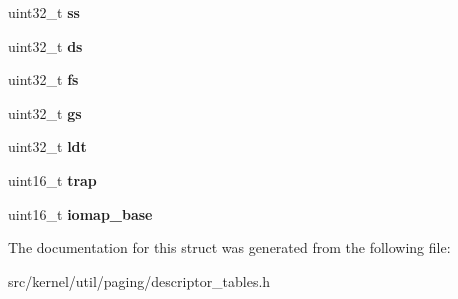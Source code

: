 \begin{DoxyCompactItemize}
uint32\+\_\+t {\bfseries ss}
\item 
\mbox{\label{structtss__entry__struct_a014d32c2d3c8d90067ded0972a0dd08f}} 
uint32\+\_\+t {\bfseries ds}
\item 
\mbox{\label{structtss__entry__struct_a8b4ea2143b898e1defeafaa781b394c1}} 
uint32\+\_\+t {\bfseries fs}
\item 
\mbox{\label{structtss__entry__struct_a55643b2899d3b16891d2f700c6b01a13}} 
uint32\+\_\+t {\bfseries gs}
\item 
\mbox{\label{structtss__entry__struct_a91717c69867816b373c9a7d934753f21}} 
uint32\+\_\+t {\bfseries ldt}
\item 
\mbox{\label{structtss__entry__struct_ad256af5ce07bb3a294b57d988aa46566}} 
uint16\+\_\+t {\bfseries trap}
\item 
\mbox{\label{structtss__entry__struct_a9ed787d26ac86a53b9278fa081e135c8}} 
uint16\+\_\+t {\bfseries iomap\+\_\+base}
\end{DoxyCompactItemize}


The documentation for this struct was generated from the following file\+:\begin{DoxyCompactItemize}
\item 
src/kernel/util/paging/descriptor\+\_\+tables.\+h\end{DoxyCompactItemize}
